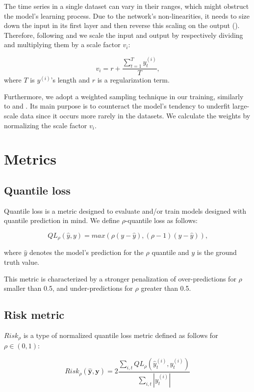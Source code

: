 \documentclass[en]{pracamgr}
\begin{document}
	The time series in a single dataset can vary in their ranges, which might obstruct the model's learning process. Due to the network's non-linearities, it needs to size down the input in its first layer and then reverse this scaling on the output (\cite{deepar}). Therefore, following \cite{enhancing} and \cite{deepar} we scale the input and output by respectively dividing and multiplying them by a scale factor $v_i$:
	
	$$ v_i = r + \frac{\sum^{T}_{t=1} y^{(i)}_t}{T} \text{,}$$
	where $T$ is $y^{(i)}$'s length and $r$ is a regularization term.
	
	Furthermore, we adopt a weighted sampling technique in our training, similarly to \cite{enhancing} and \cite{deepar}. Its main purpose is to counteract the model's tendency to underfit large-scale data since it occurs more rarely in the datasets. 
	We calculate the weights by normalizing the scale factor $v_i$.
	
	\section{Metrics}
	
	\subsection{Quantile loss}
	
	Quantile loss is a metric designed to evaluate and/or train models designed with quantile prediction in mind.
	We define $\rho$-quantile loss as follows:
	
	$$ QL_\rho(\hat{y}, y) = max(\rho(y - \hat{y}), (\rho - 1)(y - \hat{y})) \text{,} $$
	
	where $\hat{y}$ denotes the model's prediction for the $\rho$ quantile and $y$ is the ground truth value.
	
	This metric is characterized by a stronger penalization of over-predictions for $\rho$ smaller than 0.5, and under-predictions for $\rho$ greater than 0.5.
	
	\subsection{Risk metric}\label{s:risk}
	
	$Risk_\rho$ is a type of normalized quantile loss metric defined as follows for $\rho \in (0,1)$:
	
	$$ Risk_\rho(\hat{\textbf{y}}, \textbf{y}) 
	= 2\frac{\sum_{i,t}QL_\rho(\hat{y}^{(i)}_t, y^{(i)}_t)}
	{\sum_{i,t} |y^{(i)}_t|}$$
	
\end{document}
